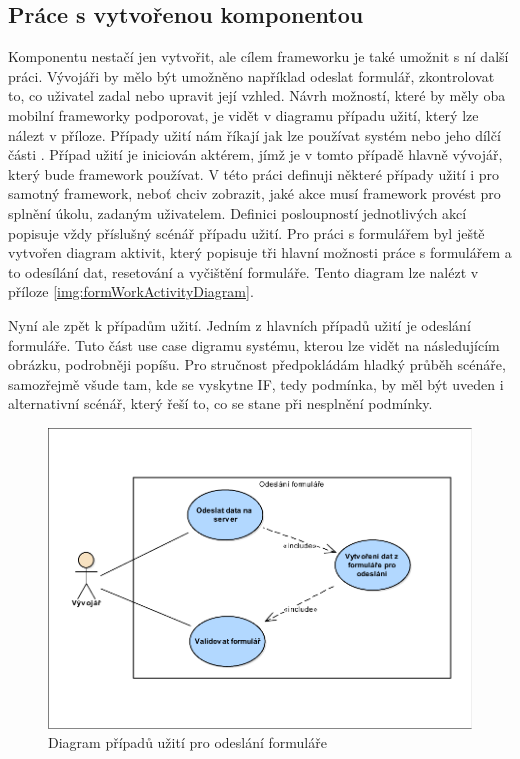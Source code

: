 \subsection{Práce s vytvořenou komponentou}
Komponentu nestačí jen vytvořit, ale cílem frameworku je také umožnit s ní další práci. Vývojáři by mělo být umožněno například odeslat formulář, zkontrolovat to, co uživatel zadal nebo upravit její vzhled. Návrh možností, které by měly oba mobilní frameworky podporovat, je vidět v diagramu případu užití, který lze nálezt v příloze. Případy užití nám říkají jak lze používat systém nebo jeho dílčí části \cite{arlow-viz-plocha}. Případ užití je iniciován aktérem, jímž je v tomto případě hlavně vývojář, který bude framework používat. V této práci definuji některé případy užití i pro samotný framework, neboť chciv zobrazit, jaké akce musí framework provést pro splnění úkolu, zadaným uživatelem. Definici posloupností jednotlivých akcí popisuje vždy příslušný scénář případu užití. Pro práci s formulářem byl ještě vytvořen diagram aktivit, který popisuje tři hlavní možnosti práce s formulářem a to odesílání dat, resetování a vyčištění formuláře. Tento diagram lze nalézt v příloze \ref{img:formWorkActivityDiagram}.

Nyní ale zpět k případům užití. Jedním z hlavních případů užití je odeslání formuláře. Tuto část use case digramu systému, kterou lze vidět na následujícím obrázku, podrobněji popíšu. Pro stručnost předpokládám hladký průběh scénáře, samozřejmě všude tam, kde se vyskytne IF, tedy podmínka, by měl být uveden i alternativní scénář, který řeší to, co se stane při nesplnění podmínky.
\begin{figure}[h!]
\includegraphics[width=\textwidth]{figures/useCaseFormSend}
\caption{Diagram případů užití pro odeslání formuláře}
\label{img:useCaseModelFormSend}
\end{figure}

